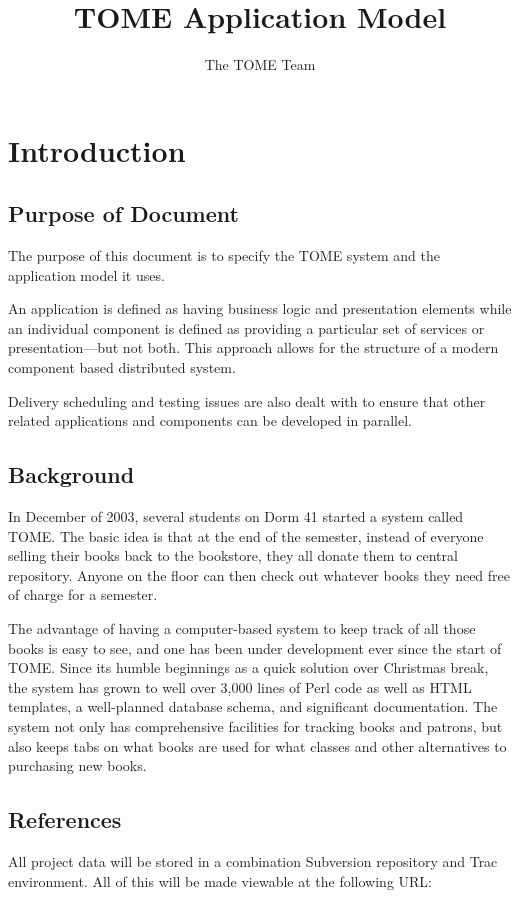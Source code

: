 \documentclass[12pt,titlepage]{article}
\author{The TOME Team}
\title{\textbf{TOME Application Model}}
\begin{document}
\maketitle
\tableofcontents
\listoffigures
\newpage
\section{Introduction}
\subsection{Purpose of Document}
The purpose of this document is to specify the TOME system and the application model it uses.

An application is defined as having business logic and presentation elements while an individual component is defined as providing a particular set of services or presentation—but not both. This approach allows for the structure of a modern component based distributed system.

Delivery scheduling and testing issues are also dealt with to ensure that other related applications and components can be developed in parallel.
\subsection{Background}
In December of 2003, several students on Dorm 41 started a system called TOME.  The basic idea is that at the end of the semester, instead of everyone selling their books back to the bookstore, they all donate them to central repository.  Anyone on the floor can then check out whatever books they need free of charge for a semester.

The advantage of having a computer-based system to keep track of all those books is easy to see, and one has been under development ever since the start of TOME.  Since its humble beginnings as a quick solution over Christmas break, the system has grown to well over 3,000 lines of Perl code as well as HTML templates, a well-planned database schema, and significant documentation.  The system not only has comprehensive facilities for tracking books and patrons, but also keeps tabs on what books are used for what classes and other alternatives to purchasing new books.
\subsection{References}
\label{references}
All project data will be stored in a combination Subversion repository and Trac environment.  All of this will be made viewable at the following URL:
\end{document}
